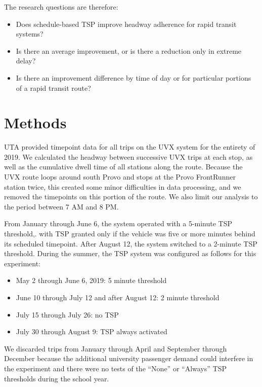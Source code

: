 \documentclass[3p, authoryear, review]{elsarticle} %
\providecommand{\tightlist}{%
  \setlength{\itemsep}{0pt}\setlength{\parskip}{0pt}}
\begin{document}
The research questions are therefore:

\begin{itemize}
\tightlist
\item
  Does schedule-based TSP improve headway adherence for rapid transit systems?
\item
  Is there an average improvement, or is there a reduction only in extreme delay?
\item
  Is there an improvement difference by time of day or for particular portions of
  a rapid transit route?
\end{itemize}

\hypertarget{methods}{%
\section{Methods}\label{methods}}

UTA provided timepoint data for all trips on the UVX system for the entirety of
2019. We calculated the headway between successive UVX trips at each stop, as
well as the cumulative dwell time of all stations along the route. Because the
UVX route loops around south Provo and stops at the Provo FrontRunner station
twice, this created some minor difficulties in data processing, and we removed
the timepoints on this portion of the route. We also limit our analysis to the
period between 7 AM and 8 PM.

From January through June 6, the system operated with a 5-minute TSP threshold,.
with TSP granted only if the vehicle was five or more minutes behind its
scheduled timepoint. After August 12, the system switched to a 2-minute TSP
threshold. During the summer, the TSP system was configured as follows for this
experiment:

\begin{itemize}
\tightlist
\item
  May 2 through June 6, 2019: 5 minute threshold
\item
  June 10 through July 12 and after August 12: 2 minute threshold
\item
  July 15 through July 26: no TSP
\item
  July 30 through August 9: TSP always activated
\end{itemize}

We discarded trips from January through April and September through December
because the additional university passenger demand could interfere in the
experiment and there were no tests of the ``None'' or ``Always'' TSP thresholds
during the school year.
\end{document}
